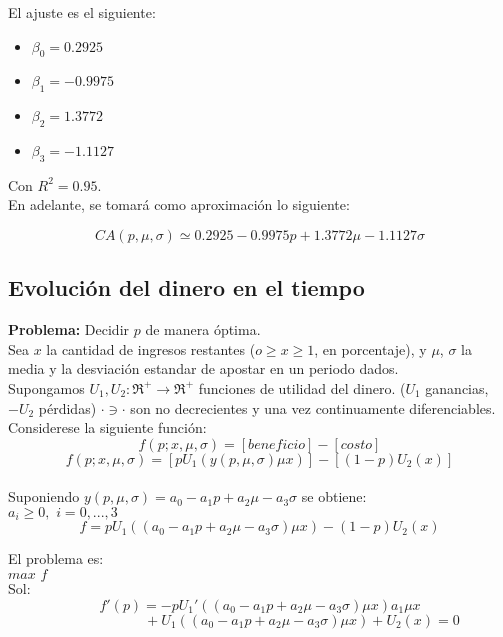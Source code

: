  El ajuste es el siguiente:

 \begin{itemize}
  \item $\beta_0=0.2925$
   \item $\beta_1=-0.9975$
  \item $\beta_2=1.3772$
  \item $\beta_3=-1.1127$
 \end{itemize}

 Con $R^2=0.95$.\\

 En adelante, se tomará como aproximación lo siguiente:

 \[CA(p,\mu,\sigma)\simeq0.2925-0.9975p+1.3772\mu-1.1127\sigma\]

 \subsection{Evolución del dinero en el tiempo}
 \label{sec:evolucion-dinero}
 {\bf Problema:} Decidir $p$ de manera óptima.\\

 Sea $x$ la cantidad de ingresos restantes ($o\ge x\ge1$, en porcentaje), y $\mu$, $\sigma$ la media y la desviación estandar de apostar en un periodo dados.\\

 Supongamos $U_1,U_2: \Re^+\rightarrow \Re^+$ funciones de utilidad del dinero. ($U_1$ ganancias, $-U_2$ pérdidas) $\cdot\ni\cdot$ son no decrecientes y una vez continuamente diferenciables. Considerese la siguiente función:\\

 \[f(p;x,\mu,\sigma)=[beneficio]-[costo]\]
 \[f(p;x,\mu,\sigma)=[pU_1(y(p,\mu,\sigma)\mu x)]-[(1-p)U_2(x)]\]\\

 Suponiendo $y(p,\mu,\sigma)=a_0-a_1p+a_2\mu-a_3\sigma$ se obtiene:\\

 $a_i\ge 0,\,\,i=0,...,3$
 \[f=pU_1((a_0-a_1p+a_2\mu-a_3\sigma)\mu x)-(1-p)U_2(x)\]

 El problema es:\\

 $max\,\,f$\\

 Sol:\\

 \[f'(p)=-pU_1'((a_0-a_1p+a_2\mu-a_3\sigma)\mu x)a_1\mu x\]
 \[\qquad\qquad\qquad+U_1((a_0-a_1p+a_2\mu-a_3\sigma)\mu x)+U_2(x)=0\]


